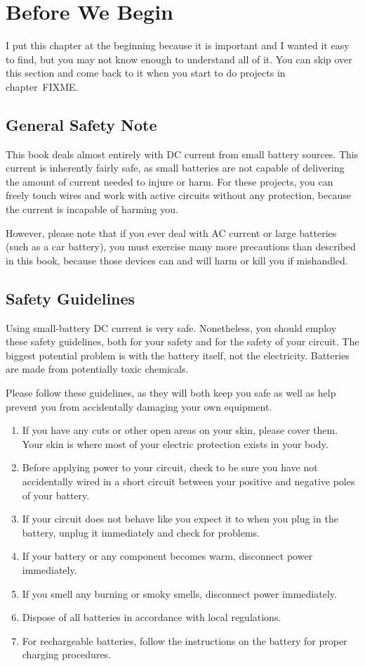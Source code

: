 \chapter{Before We Begin}

I put this chapter at the beginning because it is important and I wanted it easy to find, but you may not know enough to understand all of it.
You can skip over this section and come back to it when you start to do projects in chapter~FIXME.

\section{General Safety Note}
This book deals almost entirely with DC current from small battery sources.  
This current is inherently fairly safe, as small batteries are not capable of delivering the amount of current needed to injure or harm.  
For these projects, you can freely touch wires and work with active circuits without any protection, because the current is incapable of harming you.  

However, please note that if you ever deal with AC current or large batteries (such as a car battery), you must exercise many more precautions than described in this book, because those devices can and will harm or kill you if mishandled.

\section{Safety Guidelines}

Using small-battery DC current is very safe.  Nonetheless, you should employ these safety guidelines, both for your safety and for the safety of your circuit.  The biggest potential problem is with the battery itself, not the electricity.  Batteries are made from potentially toxic chemicals.

Please follow these guidelines, as they will both keep you safe as well as help prevent you from accidentally damaging your own equipment.

\begin{enumerate}
\item If you have any cuts or other open areas on your skin, please cover them. Your skin is where most of your electric protection exists in your body.
\item Before applying power to your circuit, check to be sure you have not accidentally wired in a short circuit between your positive and negative poles of your battery.
\item If your circuit does not behave like you expect it to when you plug in the battery, unplug it immediately and check for problems.
\item If your battery or any component becomes warm, disconnect power immediately.
\item If you smell any burning or smoky smells, disconnect power immediately.
\item Dispose of all batteries in accordance with local regulations.
\item For rechargeable batteries, follow the instructions on the battery for proper charging procedures.
\end{enumerate}

